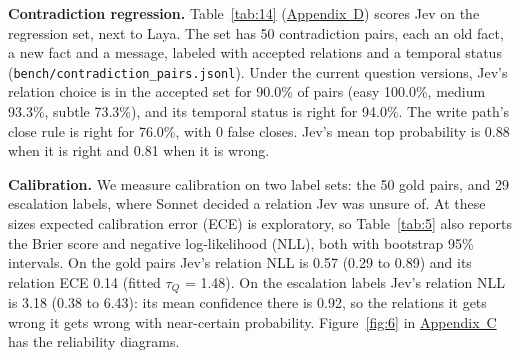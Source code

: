 \documentclass[11pt]{article}
\newcommand{\src}[1]{}
\begin{document}
\textbf{Contradiction regression.} Table~\ref{tab:14} (\hyperref[app:D]{Appendix~D}) scores Jev on the regression set, next to Laya. The set has 50\src{bench/results/tradeoff.json} contradiction pairs, each an old fact, a new fact and a message, labeled with accepted relations and a temporal status (\texttt{bench/\allowbreak{}contradiction\_\allowbreak{}pairs.jsonl}). Under the current question versions, Jev's relation choice is in the accepted set for 90.0\%\src{bench/results/jev\_regression\_v2.json} of pairs (easy 100.0\%\src{bench/results/jev\_regression\_v2.json}, medium 93.3\%\src{bench/results/jev\_regression\_v2.json}, subtle 73.3\%\src{bench/results/jev\_regression\_v2.json}), and its temporal status is right for 94.0\%\src{bench/results/jev\_regression\_v2.json}. The write path's close rule is right for 76.0\%\src{bench/results/jev\_regression\_v2.json}, with 0\src{bench/results/jev\_regression\_v2.json} false closes. Jev's mean top probability is 0.88\src{bench/results/jev\_regression\_v2.json} when it is right and 0.81\src{bench/results/jev\_regression\_v2.json} when it is wrong.

\textbf{Calibration.} We measure calibration on two label sets: the 50\src{bench/results/tradeoff.json} gold pairs, and 29\src{bench/results/calibration.json} escalation labels, where Sonnet decided a relation Jev was unsure of. At these sizes expected calibration error (ECE) is exploratory, so Table~\ref{tab:5} also reports the Brier score and negative log-likelihood (NLL), both with bootstrap 95\% intervals. On the gold pairs Jev's relation NLL is 0.57\src{bench/results/calibration\_scores.json} (0.29\src{bench/results/calibration\_scores.json} to 0.89\src{bench/results/calibration\_scores.json}) and its relation ECE 0.14\src{bench/results/calibration.json} (fitted $\tau_Q$ = 1.48\src{bench/results/calibration.json}). On the escalation labels Jev's relation NLL is 3.18\src{bench/results/calibration\_scores.json} (0.38\src{bench/results/calibration\_scores.json} to 6.43\src{bench/results/calibration\_scores.json}): its mean confidence there is 0.92\src{bench/results/calibration.json}, so the relations it gets wrong it gets wrong with near-certain probability. Figure~\ref{fig:6} in \hyperref[app:C]{Appendix~C} has the reliability diagrams.
\end{document}
